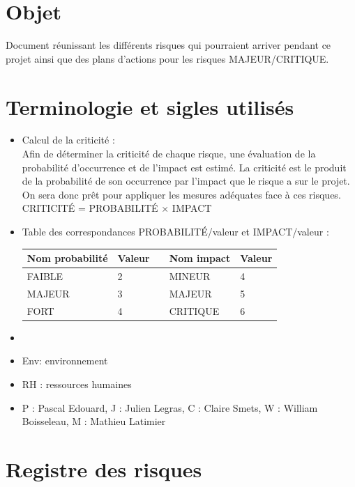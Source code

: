 \documentclass[a4paper,11pt,french]{article}
\begin{document}
\clearpage
\tableofcontents
\clearpage
\section{Objet}
Document réunissant les différents risques qui pourraient arriver pendant ce projet ainsi que des plans d'actions pour les risques MAJEUR/CRITIQUE.

\section{Terminologie et sigles utilisés}
\begin{itemize}
\item Calcul de la criticité :\\

Afin de déterminer la criticité de chaque risque, une évaluation de la probabilité d'occurrence et de l'impact est estimé. La criticité est le produit de la probabilité de son occurrence par l'impact que le risque a sur le projet. On sera donc prêt pour appliquer les mesures adéquates face à ces risques. \\

{\centering CRITICITÉ = PROBABILITÉ $\times$ IMPACT} \\

\item Table des correspondances PROBABILITÉ/valeur et IMPACT/valeur :\\

\begin{center}
\begin{tabular}{|l|l|c|l|l|}
\hline
\textbf{Nom probabilité}&\textbf{Valeur}&&\textbf{Nom impact}&\textbf{Valeur}\\
\hline
FAIBLE&2&&MINEUR&4\\
\hline
MAJEUR&3&&MAJEUR&5\\
\hline
FORT&4&&CRITIQUE&6\\
\hline
\end{tabular}
\end{center}
\item []
\item Env: environnement
\item RH : ressources humaines
\item P : Pascal Edouard, J : Julien Legras, C : Claire Smets, W : William Boisseleau, M : Mathieu Latimier
\end{itemize}
\section{Registre des risques}
\end{document}
